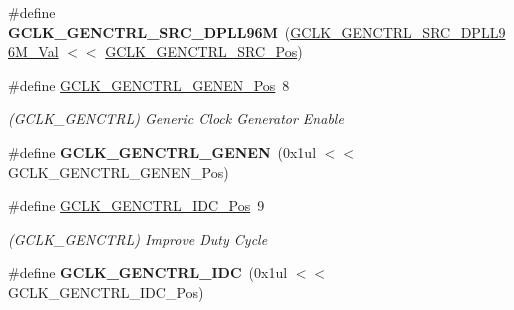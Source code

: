 \begin{DoxyCompactItemize}
\item 
\hypertarget{group___s_a_m_l21___g_c_l_k_ga37655e8d025a0b4ce2de20bd71e8db64}{}\#define {\bfseries G\+C\+L\+K\+\_\+\+G\+E\+N\+C\+T\+R\+L\+\_\+\+S\+R\+C\+\_\+\+D\+P\+L\+L96\+M}~(\hyperlink{group___s_a_m_l21___g_c_l_k_gadf9c51d674d25e89631e118291f82657}{G\+C\+L\+K\+\_\+\+G\+E\+N\+C\+T\+R\+L\+\_\+\+S\+R\+C\+\_\+\+D\+P\+L\+L96\+M\+\_\+\+Val}  $<$$<$ \hyperlink{group___s_a_m_l21___g_c_l_k_ga3ca6fb0d36a0f1194282d2517b22965f}{G\+C\+L\+K\+\_\+\+G\+E\+N\+C\+T\+R\+L\+\_\+\+S\+R\+C\+\_\+\+Pos})\label{group___s_a_m_l21___g_c_l_k_ga37655e8d025a0b4ce2de20bd71e8db64}

\item 
\hypertarget{group___s_a_m_l21___g_c_l_k_gacf206c291132d560c6f857c74d042b09}{}\#define \hyperlink{group___s_a_m_l21___g_c_l_k_gacf206c291132d560c6f857c74d042b09}{G\+C\+L\+K\+\_\+\+G\+E\+N\+C\+T\+R\+L\+\_\+\+G\+E\+N\+E\+N\+\_\+\+Pos}~8\label{group___s_a_m_l21___g_c_l_k_gacf206c291132d560c6f857c74d042b09}

\begin{DoxyCompactList}\small\item\em (G\+C\+L\+K\+\_\+\+G\+E\+N\+C\+T\+R\+L) Generic Clock Generator Enable \end{DoxyCompactList}\item 
\hypertarget{group___s_a_m_l21___g_c_l_k_gaaff89a081b47174a1ebf7893d638d911}{}\#define {\bfseries G\+C\+L\+K\+\_\+\+G\+E\+N\+C\+T\+R\+L\+\_\+\+G\+E\+N\+E\+N}~(0x1ul $<$$<$ G\+C\+L\+K\+\_\+\+G\+E\+N\+C\+T\+R\+L\+\_\+\+G\+E\+N\+E\+N\+\_\+\+Pos)\label{group___s_a_m_l21___g_c_l_k_gaaff89a081b47174a1ebf7893d638d911}

\item 
\hypertarget{group___s_a_m_l21___g_c_l_k_gadd1c684492c64ddc0b937c7571028381}{}\#define \hyperlink{group___s_a_m_l21___g_c_l_k_gadd1c684492c64ddc0b937c7571028381}{G\+C\+L\+K\+\_\+\+G\+E\+N\+C\+T\+R\+L\+\_\+\+I\+D\+C\+\_\+\+Pos}~9\label{group___s_a_m_l21___g_c_l_k_gadd1c684492c64ddc0b937c7571028381}

\begin{DoxyCompactList}\small\item\em (G\+C\+L\+K\+\_\+\+G\+E\+N\+C\+T\+R\+L) Improve Duty Cycle \end{DoxyCompactList}\item 
\hypertarget{group___s_a_m_l21___g_c_l_k_ga20defe310838ae549c7f9820de38e1bb}{}\#define {\bfseries G\+C\+L\+K\+\_\+\+G\+E\+N\+C\+T\+R\+L\+\_\+\+I\+D\+C}~(0x1ul $<$$<$ G\+C\+L\+K\+\_\+\+G\+E\+N\+C\+T\+R\+L\+\_\+\+I\+D\+C\+\_\+\+Pos)\label{group___s_a_m_l21___g_c_l_k_ga20defe310838ae549c7f9820de38e1bb}


\end{DoxyCompactItemize}
